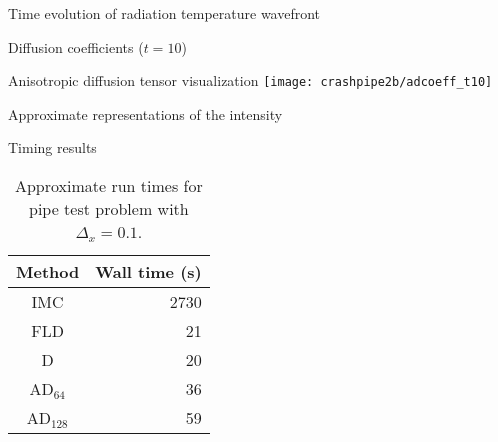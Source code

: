 \documentclass{beamer}
\begin{document}
\begin{frame}{Time evolution of radiation temperature wavefront}
  \centering%
  \par
\end{frame}
\begin{frame}{Diffusion coefficients ($t=10$)}
  \centering%
  \par
\end{frame}
\begin{frame}{Anisotropic diffusion tensor visualization}
  \centering%
  \texttt{[image: crashpipe2b/adcoeff\_t10]}%
  \par
\end{frame}
\begin{frame}{Approximate representations of the intensity}
  \centering%
  \par
\end{frame}
\begin{frame}{Timing results}
  \begin{table}[htb]
    \centering
    \begin{tabular}{cr}
      Method & Wall time (s) \\ \hline
      IMC & 2730 \\
      FLD & 21 \\
      D   & 20 \\
      AD$_{64}$ & 36 \\
      AD$_{128}$ & 59
    \end{tabular}
    \caption{Approximate run times for pipe test problem with $\Delta_x=0.1$.}
    \label{tab:pipeTiming}
  \end{table}
\end{frame}

\end{document}
